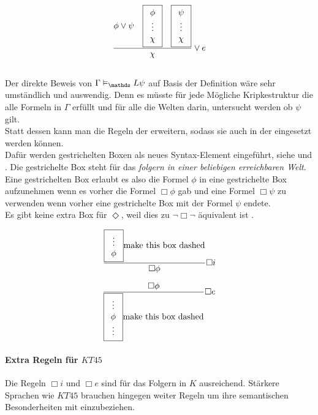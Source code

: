\begin{equation}
	\label{eq:eDisjunction}
	\frac{
		\phi \vee \psi 
		\quad \boxed{ \begin{array}{c} \phi\\ \vdots\\ \chi \end{array} } 
		\quad \boxed{ \begin{array}{c} \psi\\ \vdots\\ \chi \end{array} }
	}
	{\chi}
	\vee e
\end{equation}

\subsection{\ND \ML} %
\label{par:natuerliche_deduktion_ml}
Der direkte Beweis von $\Gamma \vDash_\Menge{L} \psi$ auf Basis der Definition wäre sehr umständlich und auswendig.
Denn es müsste für jede Mögliche Kripkestruktur die alle Formeln in $\Gamma$ erfüllt und für alle die Welten darin, untersucht werden ob $\psi$ gilt.\\
Statt dessen kann man die Regeln der \ND erweitern, sodass sie auch in der \ML eingesetzt werden können.\\
Dafür werden gestrichelten Boxen als neues Syntax-Element eingeführt, siehe  und .
Die gestrichelte Box steht für das \emph{folgern in einer beliebigen erreichbaren Welt}.\\
Eine gestrichelten Box erlaubt es also die Formel $\phi$ in eine gestrichelte Box aufzunehmen wenn es vorher die Formel $\Box \phi$ gab und eine Formel $\Box \psi$ zu verwenden wenn vorher eine gestrichelte Box mit der Formel $\psi$ endete.\\
Es gibt keine extra Box für $\Diamond$, weil dies zu $\neg \Box \neg$ äquivalent ist
\cite[329f]{huth2004logic}.

\begin{equation}
	\label{eq:iBox}
	\frac{\boxed{ \begin{array}{c} \vdots \\ \phi \end{array} } \text{make this box dashed}}{ \Box \phi} \Box i 
\end{equation}

\begin{equation}
	\label{eq:eBox}
	\frac{\Box \phi}
	{\boxed{ \begin{array}{c} \vdots\\\phi\\\vdots \end{array} } \text{make this box dashed}}
	\Box e
\end{equation}


\paragraph{Extra Regeln für $KT45$} %
\label{par:extra_regeln_fuer_kt45_}
Die Regeln $\Box i$ und $\Box e$ sind für das Folgern in $K$ ausreichend.
Stärkere Sprachen wie $KT45$ brauchen hingegen weiter Regeln um ihre semantischen Besonderheiten mit einzubeziehen. 

